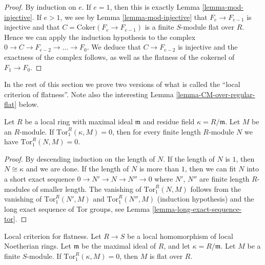 \begin{proof}
By induction on $e$. If $e = 1$, then this is exactly
Lemma \ref{lemma-mod-injective}. If $e > 1$, we see
by Lemma \ref{lemma-mod-injective} that $F_e \to F_{e-1}$
is injective and that $C = \text{Coker}(F_e \to F_{e-1})$
is a finite $S$-module flat over $R$. Hence we can
apply the induction hypothesis to the complex
$0 \to C \to F_{e-2} \to \ldots \to F_0$.
We deduce that $C \to F_{e-2}$ is injective
and the exactness of the complex follows, as well
as the flatness of the cokernel of $F_1 \to F_0$.
\end{proof}

\noindent
In the rest of this section we prove two versions of what is called the
``local criterion of flatness''. Note also the interesting
Lemma \ref{lemma-CM-over-regular-flat} below.

\begin{lemma}
\label{lemma-prepare-local-criterion-flatness}
Let $R$ be a local ring with maximal ideal $\mathfrak m$
and residue field $\kappa = R/\mathfrak m$.
Let $M$ be an $R$-module. If $\text{Tor}_1^R(\kappa, M) = 0$,
then for every finite length $R$-module $N$ we have
$\text{Tor}_1^R(N, M) = 0$.
\end{lemma}

\begin{proof}
By descending induction on the length of $N$.
If the length of $N$ is $1$, then $N \cong \kappa$
and we are done. If the length of $N$ is more than
$1$, then we can fit $N$ into a short exact sequence
$0 \to N' \to N \to N'' \to 0$ where $N'$, $N''$ are
finite length $R$-modules of smaller length.
The vanishing of $\text{Tor}_1^R(N, M)$ follows
from the vanishing of $\text{Tor}_1^R(N', M)$
and $\text{Tor}_1^R(N'', M)$ (induction hypothesis)
and the long exact sequence of Tor groups, see Lemma
\ref{lemma-long-exact-sequence-tor}.
\end{proof}

\begin{lemma}
\label{lemma-local-criterion-flatness}
Local criterion for flatness.
Let $R \to S$ be a local homomorphism of local Noetherian
rings. Let $\mathfrak m$ be the maximal ideal of $R$,
and let $\kappa = R/\mathfrak m$.
Let $M$ be a finite $S$-module. If $\text{Tor}_1^R(\kappa, M) = 0$,
then $M$ is flat over $R$.
\end{lemma}

